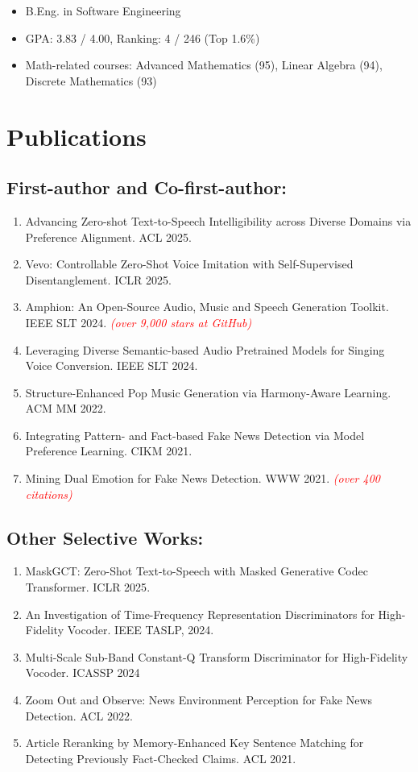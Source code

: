 \documentclass{resume}
\begin{document}
{
  \small
  \begin{itemize}
    \item B.Eng. in Software Engineering
    \item GPA: 3.83 / 4.00, Ranking: 4 / 246 (Top 1.6\%)
    \item Math-related courses: Advanced Mathematics (95), Linear Algebra (94), Discrete
          Mathematics (93)
  \end{itemize}
}

\section{Publications}

\subsection{\textbf{First-author and Co-first-author:}}
\begin{enumerate}\itemsep 0.5em
  \item Advancing Zero-shot Text-to-Speech Intelligibility across Diverse Domains via Preference Alignment. {ACL 2025}.
  \item Vevo: Controllable Zero-Shot Voice Imitation with Self-Supervised Disentanglement. {ICLR 2025}.
  \item Amphion: An Open-Source Audio, Music and Speech Generation Toolkit. {IEEE SLT 2024.} \textcolor{red}{\textit{(over 9,000 stars at GitHub)}}
  \item Leveraging Diverse Semantic-based Audio Pretrained Models for Singing Voice Conversion. {IEEE SLT 2024.}
  \item Structure-Enhanced Pop Music Generation via Harmony-Aware Learning. {ACM MM 2022.}
  \item Integrating Pattern- and Fact-based Fake News Detection via Model Preference Learning. {CIKM 2021.}
  \item Mining Dual Emotion for Fake News Detection. {WWW 2021.} \textcolor{red}{\textit{(over 400 citations)}}
\end{enumerate}

\subsection{\textbf{Other Selective Works:}}
\begin{enumerate}\itemsep 0.5em
  \item MaskGCT: Zero-Shot Text-to-Speech with Masked Generative Codec Transformer. {ICLR 2025}.
  \item An Investigation of Time-Frequency Representation Discriminators for High-Fidelity Vocoder. {IEEE TASLP, 2024.}
  \item Multi-Scale Sub-Band Constant-Q Transform Discriminator for High-Fidelity Vocoder. {ICASSP 2024}
  \item Zoom Out and Observe: News Environment Perception for Fake News Detection. {ACL 2022}.
  \item Article Reranking by Memory-Enhanced Key Sentence Matching for Detecting Previously Fact-Checked Claims. {ACL 2021.}
\end{enumerate}
\end{document}
